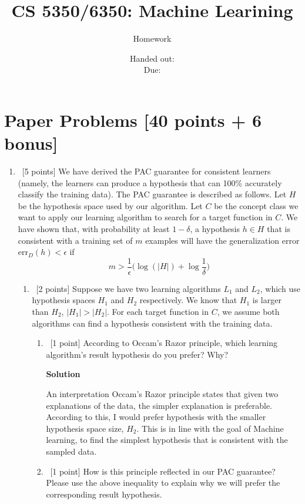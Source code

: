 \documentclass[12pt, fullpage,letterpaper]{article}
\title{CS 5350/6350: Machine Learining \semester}
\author{Homework \assignmentId}
\date{Handed out: \releaseDate\\
	Due: \dueDate}
\newcommand{\solution}{\textbf{\large Solution}}
\begin{document}
\maketitle


{\footnotesize
	
}


\section{Paper Problems [40 points + 6 bonus]}
\begin{enumerate}
\item~[5 points] We have derived the PAC guarantee for consistent learners (namely, the learners can produce a hypothesis that can 100\% accurately classify the training data). The PAC guarantee is described as follows. Let $H$ be the hypothesis space used by our algorithm. Let $C$ be the concept class we want to apply our learning algorithm to search for a target function in $C$. We have shown that,  with probability at least $1-\delta$, a hypothesis $h\in H$ that is consistent with a training set of $m$ examples will have the generalization error $\mathrm{err}_D(h) < \epsilon$ if 
\[
m > \frac{1}{\epsilon}\big(\log(|H|) + \log\frac{1}{\delta}\big)
\]

\begin{enumerate}
	\item~[2 points] Suppose we have two learning algorithms $L_1$ and $L_2$, which use hypothesis spaces $H_1$ and $H_2$ respectively. We know that $H_1$ is larger than $H_2$, \ie $|H_1| > |H_2|$.
	For each target function in $C$, we assume both algorithms can find a hypothesis consistent with the training data. 
	\begin{enumerate}
		\item~[1 point] According to Occam's Razor principle, which learning algorithm's  result hypothesis do you prefer? Why?
		
		\solution
		
		An interpretation Occam's Razor principle states that given two explanations of the data, the simpler explanation is preferable. According to this, I would prefer hypothesis with the smaller hypothesis space size, $H_2$. This is in line with the goal of Machine learning, to find the simplest hypothesis that is consistent with the sampled data. 
		
		
		\item~[1 point]  How is this principle reflected in our PAC guarantee? Please use the above inequality to explain why we will prefer the corresponding result hypothesis. 
	\end{enumerate}
	

\end{enumerate}
\end{enumerate}
\end{document}
